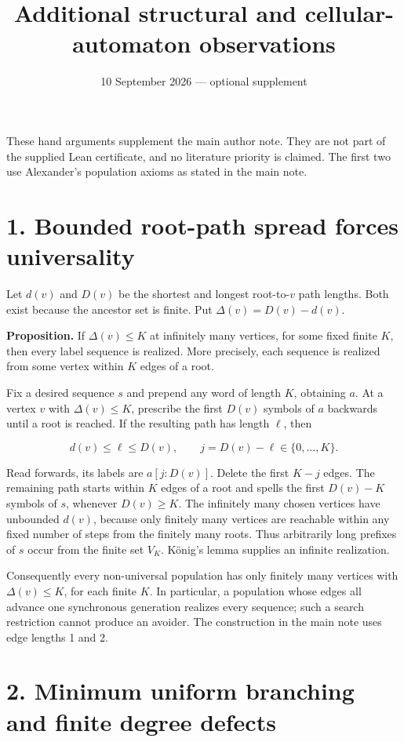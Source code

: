 \documentclass[
  11pt,
]{article}
\title{Additional structural and cellular-automaton observations}
\author{}
\date{10 September 2026 --- optional supplement}
\begin{document}
\maketitle

These hand arguments supplement the main author note. They are not part
of the supplied Lean certificate, and no literature priority is claimed.
The first two use Alexander's population axioms as stated in the main
note.

\section{1. Bounded root-path spread forces
universality}\label{bounded-root-path-spread-forces-universality}

Let \(d(v)\) and \(D(v)\) be the shortest and longest root-to-\(v\) path
lengths. Both exist because the ancestor set is finite. Put
\(\Delta(v)=D(v)-d(v)\).

\textbf{Proposition.} If \(\Delta(v)\le K\) at infinitely many vertices,
for some fixed finite \(K\), then every label sequence is realized. More
precisely, each sequence is realized from some vertex within \(K\) edges
of a root.

Fix a desired sequence \(s\) and prepend any word of length \(K\),
obtaining \(a\). At a vertex \(v\) with \(\Delta(v)\le K\), prescribe
the first \(D(v)\) symbols of \(a\) backwards until a root is reached.
If the resulting path has length \(\ell\), then

\[d(v)\le\ell\le D(v),\qquad j=D(v)-\ell\in\{0,\ldots,K\}.\]

Read forwards, its labels are \(a[j:D(v)]\). Delete the first \(K-j\)
edges. The remaining path starts within \(K\) edges of a root and spells
the first \(D(v)-K\) symbols of \(s\), whenever \(D(v)\ge K\). The
infinitely many chosen vertices have unbounded \(d(v)\), because only
finitely many vertices are reachable within any fixed number of steps
from the finitely many roots. Thus arbitrarily long prefixes of \(s\)
occur from the finite set \(V_K\). König's lemma supplies an infinite
realization.

Consequently every non-universal population has only finitely many
vertices with \(\Delta(v)\le K\), for each finite \(K\). In particular,
a population whose edges all advance one synchronous generation realizes
every sequence; such a search restriction cannot produce an avoider. The
construction in the main note uses edge lengths 1 and 2.

\section{2. Minimum uniform branching and finite degree
defects}\label{minimum-uniform-branching-and-finite-degree-defects}
\end{document}
